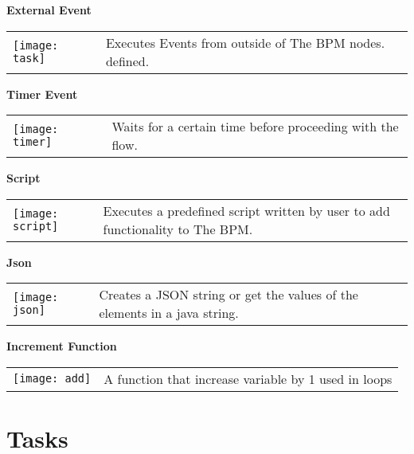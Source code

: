 \par\vspace {1cm}

\large \textbf{External Event}\\

\begin{tabular}{C{2.2cm}  L{15cm}}
    \texttt{[image: task]} &Executes Events from outside of The BPM nodes.
defined.
\end{tabular}

\par\vspace {1cm}

\large \textbf{Timer Event}\\

\begin{tabular}{C{2.2cm}  L{15cm}}
    \texttt{[image: timer]} &Waits for a certain time before proceeding with the flow.
\end{tabular}

\par\vspace {1cm}

\large \textbf{Script}\\

\begin{tabular}{C{2.2cm}  L{15cm}}
    \texttt{[image: script]} &Executes a predefined script written by user to add functionality to The
    BPM.
\end{tabular}

\par\vspace {1cm}

\large \textbf{Json}\\

\begin{tabular}{C{2.2cm}  L{15cm}}
    \texttt{[image: json]} &Creates a JSON string or get the values of the elements in a java string.
\end{tabular}

\par\vspace {1cm}

\large \textbf{Increment Function}\\

\begin{tabular}{C{2.2cm}  L{15cm}}
    \texttt{[image: add]} &A function that increase variable by 1 used in loops
\end{tabular}


\section{Tasks}

